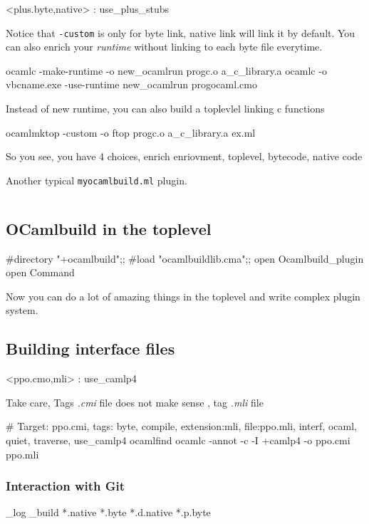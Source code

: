 \begin{bluetext}
<plus.{byte,native}> : use_plus_stubs  
\end{bluetext}
Notice that \verb|-custom| is only for byte link, native link will
link it by default. You can also enrich your \textit{runtime} without
linking to each byte file everytime.

\begin{bashcode}
  ocamlc -make-runtime -o new_ocamlrun progc.o a_c_library.a
  ocamlc -o vbcname.exe -use-runtime new_ocamlrun progocaml.cmo
\end{bashcode}
Instead of new runtime, you can also build a toplevlel linking c
functions

\begin{bashcode}
  ocamlmktop -custom -o ftop progc.o a_c_library.a ex.ml
\end{bashcode}
So you see, you have 4 choices, enrich enriovment, toplevel, bytecode,
native code


Another typical \verb|myocamlbuild.ml| plugin.
\label{myocamlbuild}
\inputminted[fontsize=\scriptsize]{ocaml}{/Users/bobzhang1988/myocamlbuild/myocamlbuild.ml}


\subsection{OCamlbuild in the toplevel }

\begin{ocamlcode}
#directory "+ocamlbuild";;
#load "ocamlbuildlib.cma";;
open Ocamlbuild_plugin
open Command 
\end{ocamlcode}

Now you can do a lot of amazing things in the toplevel and write
complex plugin system.

\subsection{Building interface files}

\begin{bashcode}
<ppo.{cmo,mli}> : use_camlp4
\end{bashcode}

Take care, Tags \textit{.cmi} file does not make sense , tag \textit{.mli} file


\begin{bashcode}
# Target: ppo.cmi, tags: { byte, compile, extension:mli, file:ppo.mli, interf, ocaml, quiet, traverse, use_camlp4 }
ocamlfind ocamlc -annot -c -I +camlp4 -o ppo.cmi ppo.mli
\end{bashcode}


\subsubsection{Interaction with Git}
\begin{bashcode}
_log
_build
*.native
*.byte
*.d.native
*.p.byte  
\end{bashcode}

